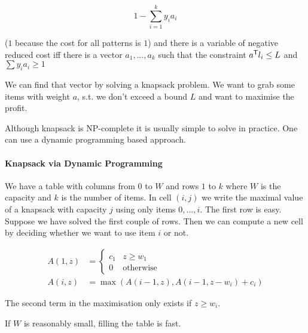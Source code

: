 \[1-\sum_{i=1}^k y_ia_i\]

($1$ because the cost for all patterns is $1$) and there is a variable of negative reduced cost iff there is a vector $a_1,\ldots,a_k$ such that the constraint ${a}^\text{\upshape \sffamily T} l_i \leq L$ and $\sum y_ia_i \geq 1$

We can find that vector by solving a knapsack problem. We want to grab some items with weight $a$, s.t. we don't exceed a bound $L$ and want to maximise the profit. 

Although knapsack is NP-complete it is usually simple to solve in practice. One can use a dynamic programming based approach.

\paragraph{Knapsack via Dynamic Programming} We have a table with columns from $0$ to $W$ and rows $1$ to $k$ where $W$ is the capacity and $k$ is the number of items. In cell $(i,j)$ we write the maximal value of a knapsack with capacity $j$ using only items $0,\ldots, i$. The first row is easy. Suppose we have solved the first couple of rows. Then we can compute a new cell by deciding whether we want to use item $i$ or not. 

\begin{align*}
A(1,z) &= \begin{cases} c_1 & z\geq w_1\\
0 & \text{otherwise}\end{cases}\\
A(i,z) &= \max (A(i-1,z), A(i-1,z-w_i)+c_i)
\end{align*}

The second term in the maximisation only exists if $z\geq w_i$.

If $W$ is reasonably small, filling the table is fast.